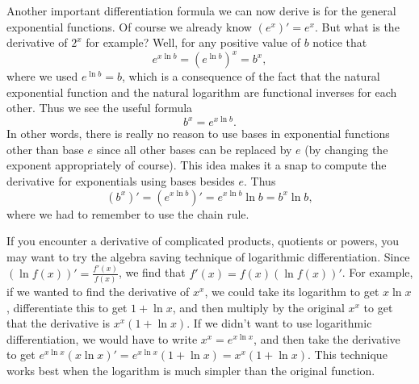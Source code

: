 Another important differentiation formula we can now derive is for
the general exponential functions. Of course we already know
$(e^x)'=e^x.$ But what is the derivative of $2^x$ for example?
Well, for any positive value of $b$ notice that
\[e^{x\ln b}=\left(e^{\ln b}\right)^x = b^x,\]
where we used $e^{\ln b}=b$, which is a consequence of the fact that
the natural exponential function and the natural logarithm are
functional inverses for each other.
Thus we see the useful formula
\[b^x=e^{x\ln b}.\]
In other words, there is really no reason to use bases in exponential
functions other than base $e$ since all other bases can be replaced by
$e$ (by changing the exponent appropriately of course). This idea makes
it a snap to compute the derivative for exponentials using bases
besides $e$. Thus
\begin{equation}
 (b^x)'=\left(e^{x\ln b}\right)'=e^{x\ln b}\ln b=b^x\ln b,
\end{equation}
where we had to remember to use the chain rule.

If you encounter a derivative of complicated products, quotients or powers,
you may want to try the algebra saving technique of logarithmic differentiation.
Since $(\ln f(x))'=\frac{f'(x)}{f(x)}$, we find that
$f'(x)=f(x)(\ln f(x))'$.  For example, if we wanted to find the derivative of
$x^x$, we could take its logarithm to get $x\ln x$, differentiate this to get
$1+\ln x$, and then multiply by the original $x^x$ to get that the derivative is
$x^x(1+\ln x)$.
If we didn't want to use logarithmic differentiation, we would have to
write $x^x=e^{x\ln x}$, and then take the derivative to get
$e^{x\ln x}(x\ln x)'=e^{x\ln x}(1+\ln x)=x^x(1+\ln x)$.
This technique works best when the logarithm is much simpler than the original
function.

